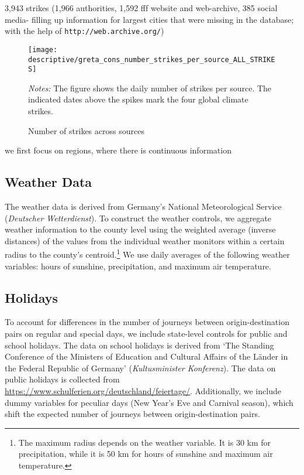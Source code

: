 3,943 strikes (1,966 authorities, 1,592 fff website and web-archive, 385 social media- filling up information for largest cities that were missing in the database; with the help of \texttt{http://web.archive.org/})

\begin{figure}[t]\centering
	\caption{Number of strikes across sources}\label{fig_greta_cons:number_strikes_per_source}
	\texttt{[image: descriptive/greta\_cons\_number\_strikes\_per\_source\_ALL\_STRIKES]}
	\begin{minipage}{0.8\linewidth}
		\scriptsize{\emph{Notes:} The figure shows the daily number of strikes per source. The indicated dates above the spikes mark the four global climate strikes.}
	\end{minipage}
\end{figure}


we first focus on regions, where there is continuous information



\subsection{Weather Data}
The weather data is derived from Germany's National Meteorological Service (\textit{Deutscher Wetterdienst}). To construct the weather controls, we aggregate weather information to the county level using the weighted average (inverse distances) of the values from the individual weather monitors within a certain radius to the county's centroid.\footnote{The maximum radius depends on the weather variable. It is 30 km for precipitation, while it is 50 km for hours of sunshine and maximum air temperature.} We use daily averages of the following weather variables: hours of sunshine, precipitation, and maximum air temperature.   



\subsection{Holidays}
To account for differences in the number of journeys between origin-destination pairs on regular and special days, we include state-level controls for public and school holidays. The data on school holidays is derived from `The Standing Conference of the Ministers of Education and Cultural Affairs of the Länder in the Federal Republic of Germany' (\textit{Kultusminister Konferenz}). The data on public holidays is collected from \url{https://www.schulferien.org/deutschland/feiertage/}. Additionally, we include dummy variables for peculiar days (New Year's Eve and Carnival season), which shift the expected number of journeys between origin-destination pairs.


